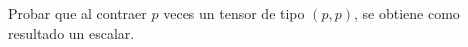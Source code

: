\item Probar que al contraer $p$ veces un tensor de tipo $(p,p)$, se obtiene como resultado un escalar.
    \begin{mdframed}[style=s]
        
    \end{mdframed}
